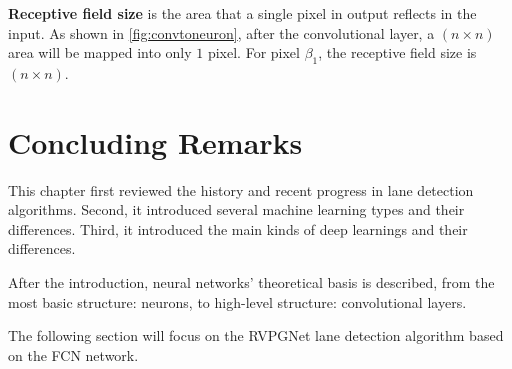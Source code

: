 \begin{spacing}{1.5}
\textbf{Receptive field size} is the area that a single pixel in output reflects in the input. As shown in \autoref{fig:convtoneuron}, after the convolutional layer, a $(n \times n)$ area will be mapped into only $1$ pixel. For pixel $\beta_1$, the receptive field size is $(n \times n)$.

\section{Concluding Remarks}

This chapter first reviewed the history and recent progress in lane detection algorithms. Second, it introduced several machine learning types and their differences. Third, it introduced the main kinds of deep learnings and their differences. 

After the introduction, neural networks' theoretical basis is described, from the most basic structure: neurons, to high-level structure: convolutional layers.

The following section will focus on the RVPGNet lane detection algorithm based on the FCN network.

\end{spacing}
\newpage
